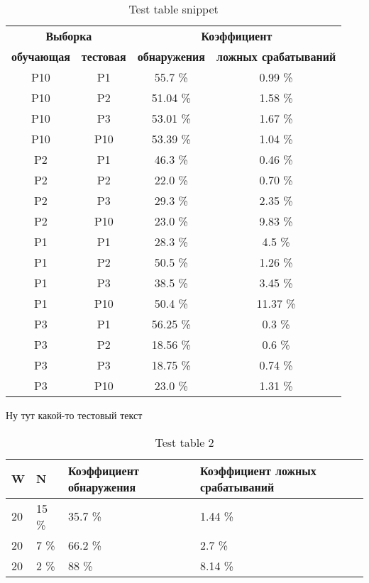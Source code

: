 \documentclass[12pt,a4paper]{article}
\begin{document}
\begin{table}
	\caption{Test table snippet}
	\label{table:training_test}
	\begin{center}
		\begin{tabular}{|c|c|c|c|}
		\hline

		\hline
		\multicolumn{2}{|c|}{\textbf{Выборка}} & \multicolumn{2}{|c|}{\textbf{Коэффициент}}\\

		\multicolumn{1}{|c}{\textbf{обучающая}} & \multicolumn{1}{c|}{\textbf{тестовая}} & \multicolumn{1}{|c}{\textbf{обнаружения}} & \multicolumn{1}{c|}{\textbf{ложных срабатываний}} \\
		\hline P10 & P1  & 55.7   \% & 0.99  \% \\
		\hline P10 & P2  & 51.04  \% & 1.58  \% \\
		\hline P10 & P3  & 53.01  \% & 1.67  \% \\
		\hline P10 & P10 & 53.39  \% & 1.04  \% \\
		\hline P2  & P1  & 46.3   \% & 0.46  \% \\
		\hline P2  & P2  & 22.0   \% & 0.70  \% \\
		\hline P2  & P3  & 29.3   \% & 2.35  \% \\
		\hline P2  & P10 & 23.0   \% & 9.83  \% \\
		\hline P1  & P1  & 28.3   \% & 4.5  \% \\
		\hline P1  & P2  & 50.5   \% & 1.26  \% \\
		\hline P1  & P3  & 38.5   \% & 3.45  \% \\
		\hline P1  & P10 & 50.4   \% & 11.37 \% \\
		\hline P3  & P1  & 56.25  \% & 0.3  \% \\
		\hline P3  & P2  & 18.56  \% & 0.6  \% \\
		\hline P3  & P3  & 18.75  \% & 0.74  \% \\
		\hline P3  & P10 & 23.0   \% & 1.31  \% \\
		\hline

		\hline
		\end{tabular}
	\end{center}
\end{table}

Ну тут какой-то тестовый текст

\begin{table}
	\caption{Test table 2}
	\label{table:fix_width}
	\begin{center}
		\begin{tabular}{|l|l|l|l|}
		\hline

		\hline
		\textbf{W} & \textbf{N} & \textbf{Коэффициент обнаружения} & \textbf{Коэффициент ложных срабатываний} \\
		\hline 20 & 15 \% & 35.7 \% & 1.44 \% \\
		\hline 20 & 7 \% & 66.2 \% & 2.7 \% \\
		\hline 20 & 2 \% & 88 \% & 8.14 \% \\
		\hline

		\hline
		\end{tabular}
	\end{center}
\end{table}
\end{document}
